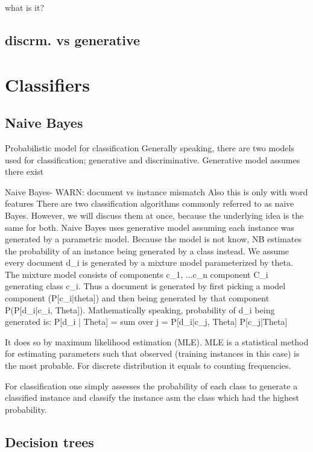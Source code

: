 what is it?

\subsection{discrm. vs generative}


\section{Classifiers}
\label{chap:clscon}

\subsection{Naive Bayes}
Probabilistic model for classification
Generally speaking, there are two models used for classification; generative and discriminative. Generative model assumes there exist 

Naive Bayes- WARN: document vs instance mismatch
Also this is only with word features
There are two classification algorithms commonly referred to as naive Bayes. However, we will discuss them at once, because the underlying idea is the same for both.
Naive Bayes uses generative model assuming each instance was generated by a parametric model. Because the model is not know, NB estimates the probability of an instance being generated by a class instead. We assume every document d\_i is generated by a mixture model parameterized by theta. The mixture model consists of components {c\_1, ...c\_n} component C\_i generating class c\_i. Thus a document is generated by first picking a model component (P[c\_i|theta]) and then being generated by that component P(P[d\_i|c\_i, Theta]).
Mathematically speaking, probability of d\_i being generated is:
P[d\_i | Theta] = sum over j = P[d\_i|c\_j, Theta] P[c\_j|Theta]


It  does so by maximum likelihood estimation (MLE).
MLE is a statistical method for estimating parameters such that observed (training instances in this case) is the most probable. For discrete distribution it equals to counting frequencies.
 
For classification one simply assesses the probability of each class to generate a classified instance and classify the instance asm the class which had the highest probability.

\subsection{Decision trees}

